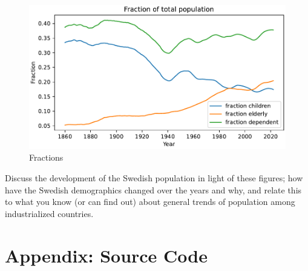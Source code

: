 \documentclass[a4paper]{article}
\begin{document}
\begin{figure}[h]
  \begin{center}
    \includegraphics[width=\textwidth]{fractions.pdf}
    \caption{Fractions}
    \label{fig:fractions}
  \end{center}
\end{figure}



Discuss the development of the Swedish population in light of these figures; how have the Swedish demographics changed over the years and why, and relate this to what you know (or can find out) about general trends of population among industrialized countries.



\printbibliography

\section*{Appendix: Source Code}

\end{document}
